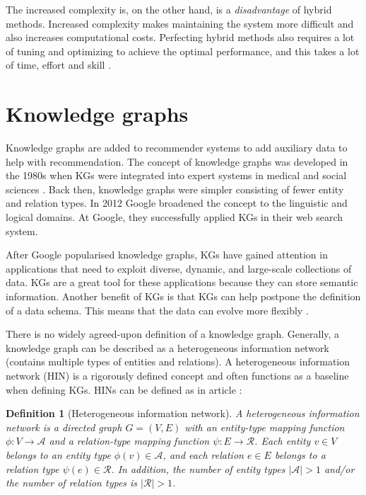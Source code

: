 \documentclass[english, 12pt, a4paper, sci, utf8, a-2b, online]{aaltothesis}
\newtheorem{definition}{Definition}[section]
\begin{document}
The increased complexity is, on the other hand, is a \textit{disadvantage} of hybrid methods. Increased complexity makes maintaining the system more difficult and also increases computational costs. Perfecting hybrid methods also requires a lot of tuning and optimizing to achieve the optimal performance, and this takes a lot of time, effort and skill \parencite{al2024traditional}.

\newpage

\section{Knowledge graphs}
\label{sec:knowledge_graphs}

Knowledge graphs are added to recommender systems to add auxiliary data to help with recommendation. The concept of knowledge graphs was developed in the 1980s when KGs were integrated into expert systems in medical and social sciences \parencite{nurdiati200825}. Back then, knowledge graphs were simpler consisting of fewer entity and relation types. In 2012 Google broadened the concept to the linguistic and logical domains. At Google, they successfully applied KGs in their web search system. 

After Google popularised knowledge graphs, KGs have gained attention in applications that need to exploit diverse, dynamic, and large-scale collections of data. KGs are a great tool for these applications because they can store semantic information. Another benefit of KGs is that KGs can help postpone the definition of a data schema. This means that the data can evolve more flexibly \parencite{10.1145/3104031}. 

There is no widely agreed-upon definition of a knowledge graph. Generally, a knowledge graph can be described as a heterogeneous information network (contains multiple types of entities and relations). A heterogeneous information network (HIN) is a rigorously defined concept and often functions as a baseline when defining KGs. HINs can be defined as in article \parencite{guo2020survey}:

\begin{definition}[Heterogeneous information network]
\label{def:HIN}
A heterogeneous information network is a directed graph $G = (V,E)$ with an entity-type mapping function $\phi : V \rightarrow \mathcal{A}$ and a relation-type mapping function $\psi: E \rightarrow \mathcal{R}$. Each entity $v\in V$ belongs to an entity type $\phi(v) \in \mathcal{A}$, and each relation $e\in E$ belongs to a relation type $\psi(e) \in \mathcal{R}$. In addition, the number of entity types $|\mathcal{A|}>1$ and/or the number of relation types is $|\mathcal{R}|>1$.
\end{definition}
\end{document}
